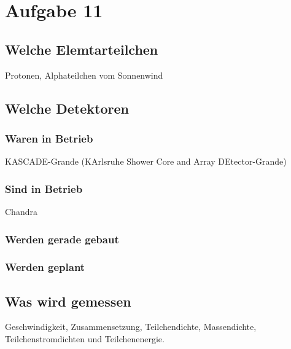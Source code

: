 \section{Aufgabe 11}
\subsection{Welche Elemtarteilchen}
Protonen, Alphateilchen vom Sonnenwind

\subsection{Welche Detektoren}
\subsubsection{Waren in Betrieb}
KASCADE-Grande (KArlsruhe Shower Core and Array DEtector-Grande)
\subsubsection{Sind in Betrieb}
Chandra
\subsubsection{Werden gerade gebaut}
\subsubsection{Werden geplant}
\subsection{Was wird gemessen}
Geschwindigkeit, Zusammensetzung, Teilchendichte, Massendichte, Teilchenstromdichten und Teilchenenergie.
